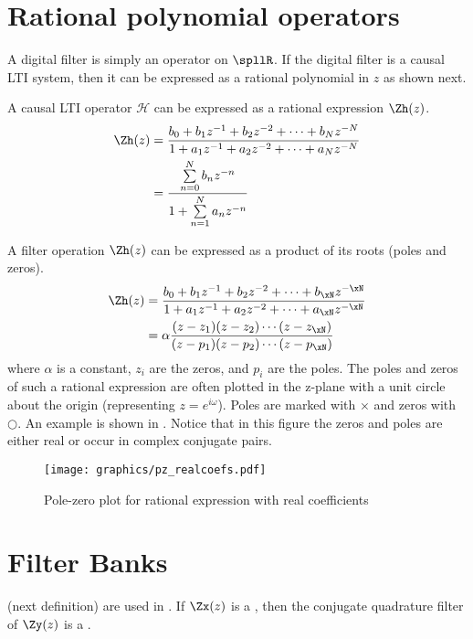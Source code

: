 \section{Rational polynomial operators}
A digital filter is simply an operator on $\spllR$.
If the digital filter is a causal LTI system, then it can be expressed as 
a rational polynomial in $z$ as shown next.

\begin{lemma}
A causal LTI operator $\mathcal{H}$ can be expressed as a rational expression $\Zh(z)$.
\begin{align*}
 \Zh(z) &= \frac{b_0 + b_1z^{-1} + b_2z^{-2} + \cdots + b_Nz^{-N}}
                {1   + a_1z^{-1} + a_2z^{-2} + \cdots + a_Nz^{-N}}
   \\   &= \frac{\sum\limits_{n=0}^{N} b_n z^{-n}}
                {1   + \sum\limits_{n=1}^{N} a_n z^{-n}}
\end{align*}
\end{lemma}


A filter operation $\Zh(z)$ can be expressed as a product of its roots (poles and zeros).
\begin{align*}
 \Zh(z) &= \frac{b_0 + b_1z^{-1} + b_2z^{-2} + \cdots + b_\xN z^{-\xN}}
                {1   + a_1z^{-1} + a_2z^{-2} + \cdots + a_\xN z^{-\xN}}
   \\   &= \alpha\frac{(z-z_1)(z-z_2)\cdots(z-z_\xN)}
                {(z-p_1)(z-p_2)\cdots(z-p_\xN)}
\end{align*}
where $\alpha$ is a constant, $z_i$ are the zeros, and $p_i$ are the poles.
The poles and zeros of such a rational expression are often plotted in the z-plane with a unit circle
about the origin (representing $z=e^{i\omega}$).
Poles are marked with $\times$ and zeros with $\bigcirc$.
An example is shown in .  
Notice that in this figure the zeros and poles are either real or occur in 
complex conjugate pairs.

\begin{figure}[ht]
  \centering
  \texttt{[image: graphics/pz\_realcoefs.pdf]}
  \caption{
     Pole-zero plot for rational expression with real coefficients
     \label{fig:pz}
     }
\end{figure}



\section{Filter Banks}
 (next definition) are used in .
If $\Zx(z)$ is a , then the conjugate quadrature filter of $\Zy(z)$ is a .

